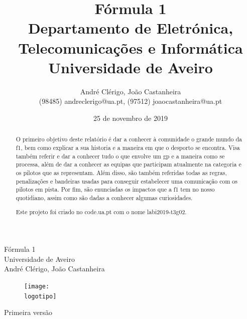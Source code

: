 \documentclass{report}
\begin{document}
%

%
%
\def\titulo{Fórmula 1}                                 
\def\data{25 de novembro de 2019}
\def\autores{André Clérigo, João Castanheira}
\def\autorescontactos{(98485) andreclerigo@ua.pt, (97512) joaocastanheira@ua.pt}
\def\versao{Primeira versão}
\def\departamento{Departamento de Eletrónica, Telecomunicações e Informática}
\def\empresa{Universidade de Aveiro}
\def\logotipo{Fotos/ua.pdf}
%
%
\begin{titlepage}

\begin{center}
%
\vspace*{50mm}
%
{\Huge \titulo}\\ 
%
\vspace{10mm}
%
{\Large \empresa}\\
%
\vspace{10mm}
%
{\LARGE \autores}\\ 
%
\vspace{30mm}
%
\begin{figure}[h]
\center
\texttt{[image: \\logotipo]}
\end{figure}
%
\vspace{30mm}
\end{center}
%
\begin{flushright}
\versao
\end{flushright}
\end{titlepage}

\title{%
{\Huge\textbf{\titulo}}\\
{\Large \departamento\\ \empresa}
}
%
\author{%
    \autores \\
    \autorescontactos
}
%
\date{\data}
%
\maketitle

\renewcommand{\abstractname}{Resumo}
\begin{abstract}

O primeiro objetivo deste relatório é dar a conhecer à comunidade o grande mundo da \ac{f1}, bem como explicar a sua historia e a maneira em que o desporto se encontra. Visa também referir e dar a conhecer tudo o que envolve um \ac{gp} e a maneira como se processa, além de dar a conhecer as equipas que participam atualmente na categoria e os pilotos que as representam. Além disso, são também referidas todas as regras, penalizações e bandeiras usadas para conseguir estabelecer uma comunicação com os pilotos em pista. Por fim, são enunciadas os impactos que a \ac{f1} tem no nosso quotidiano, assim como são dadas a conhecer algumas curiosidades.

Este projeto foi criado no code.ua.pt com o nome labi2019-t3g02.
\end{abstract}
\end{document}
